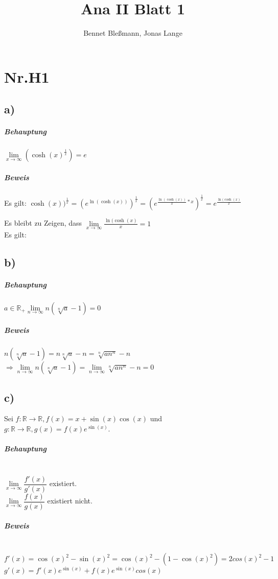 \documentclass[12pt,a4paper,oneside,ngerman]{article} %
\title{Ana II Blatt 1}
\author{Bennet Bleßmann, Jonas Lange}
\begin{document}
\maketitle
\section*{Nr.H1}
\subsection*{a)}



\subparagraph*{Behauptung}

$\lim\limits_{x \to \infty}(\cosh(x)^{\frac{1}{x}}) = e$

\subparagraph*{Beweis}

Es gilt: $\cosh(x))^{\frac{1}{x}} = (e^{\ln(\cosh(x))})^{\frac{1}{x}}
= (e^{\frac {\ln(\cosh(x))}{x}*x})^{\frac{1}{x}} = e^{\frac{\ln(\cosh(x)}{x}}$

Es bleibt zu Zeigen, dass $\lim\limits_{x \to \infty}\frac{\ln(\cosh(x)}{x} = 1 $\\ 
\indent Es gilt:  

\subsection*{b)}

\subparagraph*{Behauptung}

$a \in \mathbb{R}_{+} \lim\limits_{n \to \infty} n(\sqrt[n]{a}-1) = 0$

\subparagraph*{Beweis}

\indent $ n(\sqrt[n]{a}-1) = n\sqrt[n]{a} - n = \sqrt[n]{an^{n}} - n $ \\
\indent $ \Rightarrow \lim\limits_{n \to \infty} n(\sqrt[n]{a}-1) = \lim\limits_{n \to \infty} \sqrt[n]{an^{n}} - n = 0 $



\subsection*{c)}
Sei $ f:\mathbb{R} \to \mathbb{R},f(x) = x + \sin(x)\cos(x) $ und $ g:\mathbb{R} \to \mathbb{R},g(x) = f(x)e^{\sin(x)} $.

\subparagraph*{Behauptung} ~\\
\indent $\lim\limits_{x \to \infty} \dfrac{f'(x)}{g'(x)}$ existiert.\\
\indent $\lim\limits_{x \to \infty} \dfrac{f(x)}{g(x)}$ existiert nicht.

\subparagraph*{Beweis} ~\\
\indent $ f'(x) = \cos(x)^{2}-\sin(x)^{2} = \cos(x)^{2}-(1-\cos(x)^{2}) = 2 cos(x)^{2} - 1 $ \\
\indent $ g'(x) = f'(x)e^{\sin(x)}+f(x)e^{\sin(x)}cos(x)$ \\




	
\end{document}
